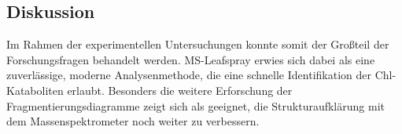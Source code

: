 \documentclass[12pt,a4paper]{article}
\begin{document}
\subsection{Diskussion}

Im Rahmen der experimentellen Untersuchungen konnte somit der Großteil der Forschungsfragen behandelt werden. MS-Leafspray erwies sich dabei als eine zuverlässige, moderne Analysenmethode, die eine schnelle Identifikation der Chl-Kataboliten erlaubt. Besonders die weitere Erforschung der Fragmentierungsdiagramme zeigt sich als geeignet, die Strukturaufklärung mit dem Massenspektrometer noch weiter zu verbessern. 

\printbibliography
\listoffigures
\end{document}

